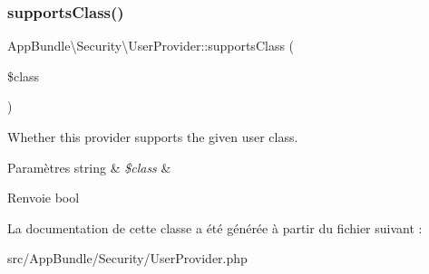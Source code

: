 \subsubsection{\texorpdfstring{supports\+Class()}{supportsClass()}}
{\footnotesize\ttfamily App\+Bundle\textbackslash{}\+Security\textbackslash{}\+User\+Provider\+::supports\+Class (\begin{DoxyParamCaption}\item[{}]{\$class }\end{DoxyParamCaption})}

Whether this provider supports the given user class.


\begin{DoxyParams}[1]{Paramètres}
string & {\em \$class} & \\
\hline
\end{DoxyParams}
\begin{DoxyReturn}{Renvoie}
bool 
\end{DoxyReturn}


La documentation de cette classe a été générée à partir du fichier suivant \+:\begin{DoxyCompactItemize}
\item 
src/\+App\+Bundle/\+Security/User\+Provider.\+php\end{DoxyCompactItemize}
